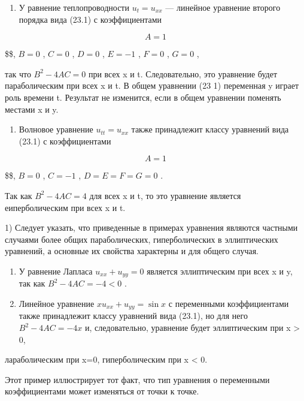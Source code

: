\documentclass[
  ukrainian,
]{article}
\providecommand{\tightlist}{%
  \setlength{\itemsep}{0pt}\setlength{\parskip}{0pt}}
\begin{document}
\begin{enumerate}
\def\labelenumi{\arabic{enumi}.}
\tightlist
\item
  У равнение теплопроводности \(u_t = u_{xx}\) --- линейное уравнение
  второго порядка вида (23.1) с коэффициентами
\end{enumerate}

\[
A=1
\]

\$\$, \(B=0\) , \(C=0\) , \(D=0\) , \(E=-1\) , \(F=0\) , \(G=0\) ,

так что \(B^2-4AC=0\) при всех x и t. Следовательно, это уравнение будет
параболическим при всех x и t. В общем уравнении (23 1) переменная y
играет роль времени t. Результат не изменится, если в общем уравнении
поменять местами x и y.

\begin{enumerate}
\def\labelenumi{\arabic{enumi}.}
\setcounter{enumi}{1}
\tightlist
\item
  Волновое уравнение \(u_{tt} = u_{xx}\) также принадлежит классу
  уравнений вида (23.1) с коэффициентами
\end{enumerate}

\[
A=1
\]

\$\$, \(B=0\) , \(C=-1\) , \(D=E=F=G=0\) .

Так как \(B^2 - 4AC = 4\) для всех x и t, то это уравнение является
еиперболическим при всех x и t.

1) Следует указать, что приведенные в примерах уравнения являются
частными случаями более общих параболических, гиперболических в
эллиптических уравнений, а основные их свойства характерны и для общего
случая.

\begin{enumerate}
\def\labelenumi{\arabic{enumi}.}
\setcounter{enumi}{2}
\item
  У равнение Лапласа \(u_{xx} + u_{yy} = 0\) является эллиптическим при
  всех x и y, так как \(B^2 - 4AC = -4 < 0\) .
\item
  Линейное уравнение \(xu_{xx} + u_{yy} = \sin x\) с переменными
  коэффициентами также принадлежит классу уравнений вида (23.1), но для
  него \(B^2-4AC=-4x\) и, следовательно, уравнение будет эллиптическим
  при x \textgreater{} 0,
\end{enumerate}

лараболическим при x=0, гиперболическим при x \textless{} 0.

Этот пример иллюстрирует тот факт, что тип уравнения о переменными
коэффициентами может изменяться от точки к точке.
\end{document}
